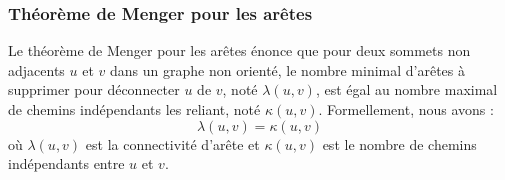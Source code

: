 \begin{frame}
\frametitle{Théorème de Menger pour les arêtes}
\begin{tcolorbox}[colback=orange!10,colframe=orange!100!black,
    title=La Connectivité et les Chemins Indépendants: Une Perspective des Arêtes]
    Le théorème de Menger pour les arêtes énonce que pour deux sommets non adjacents \( u \) et \( v \) dans un graphe non orienté, le nombre minimal d'arêtes à supprimer pour déconnecter \( u \) de \( v \), noté \( \lambda(u, v) \), est égal au nombre maximal de chemins indépendants les reliant, noté \( \kappa(u, v) \). Formellement, nous avons :
    $$ \lambda(u, v) = \kappa(u, v) $$
    où \( \lambda(u, v) \) est la connectivité d'arête et \( \kappa(u, v) \) est le nombre de chemins indépendants entre \( u \) et \( v \).
\end{tcolorbox}
\end{frame}
